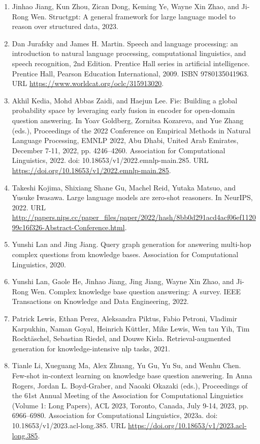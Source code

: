 \documentclass[11pt,UTF8,fontset=fandol]{ctexart}
\begin{document}
\begin{enumerate}[leftmargin=2em]
\item Jinhao Jiang, Kun Zhou, Zican Dong, Keming Ye, Wayne Xin Zhao, and Ji-Rong Wen. Structgpt: A general framework for large language model to reason over structured data, 2023.
\item Dan Jurafsky and James H. Martin. Speech and language processing: an introduction to natural language processing, computational linguistics, and speech recognition, 2nd Edition. Prentice Hall series in artificial intelligence. Prentice Hall, Pearson Education International, 2009. ISBN 9780135041963. URL \url{https://www.worldcat.org/oclc/315913020}.
\item Akhil Kedia, Mohd Abbas Zaidi, and Haejun Lee. Fie: Building a global probability space by leveraging early fusion in encoder for open-domain question answering. In Yoav Goldberg, Zornitsa Kozareva, and Yue Zhang (eds.), Proceedings of the 2022 Conference on Empirical Methods in Natural Language Processing, EMNLP 2022, Abu Dhabi, United Arab Emirates, December 7-11, 2022, pp. 4246--4260. Association for Computational Linguistics, 2022. doi: 10.18653/v1/2022.emnlp-main.285. URL \url{https://doi.org/10.18653/v1/2022.emnlp-main.285}.
\item Takeshi Kojima, Shixiang Shane Gu, Machel Reid, Yutaka Matsuo, and Yusuke Iwasawa. Large language models are zero-shot reasoners. In NeurIPS, 2022. URL \url{http://papers.nips.cc/paper_files/paper/2022/hash/8bb0d291acd4acf06ef112099c16f326-Abstract-Conference.html}.
\item Yunshi Lan and Jing Jiang. Query graph generation for answering multi-hop complex questions from knowledge bases. Association for Computational Linguistics, 2020.
\item Yunshi Lan, Gaole He, Jinhao Jiang, Jing Jiang, Wayne Xin Zhao, and Ji-Rong Wen. Complex knowledge base question answering: A survey. IEEE Transactions on Knowledge and Data Engineering, 2022.
\item Patrick Lewis, Ethan Perez, Aleksandra Piktus, Fabio Petroni, Vladimir Karpukhin, Naman Goyal, Heinrich K\"{u}ttler, Mike Lewis, Wen tau Yih, Tim Rockt\"{a}schel, Sebastian Riedel, and Douwe Kiela. Retrieval-augmented generation for knowledge-intensive nlp tasks, 2021.
\item Tianle Li, Xueguang Ma, Alex Zhuang, Yu Gu, Yu Su, and Wenhu Chen. Few-shot in-context learning on knowledge base question answering. In Anna Rogers, Jordan L. Boyd-Graber, and Naoaki Okazaki (eds.), Proceedings of the 61st Annual Meeting of the Association for Computational Linguistics (Volume 1: Long Papers), ACL 2023, Toronto, Canada, July 9-14, 2023, pp. 6966--6980. Association for Computational Linguistics, 2023a. doi: 10.18653/v1/2023.acl-long.385. URL \url{https://doi.org/10.18653/v1/2023.acl-long.385}.

\end{enumerate}
\end{document}
